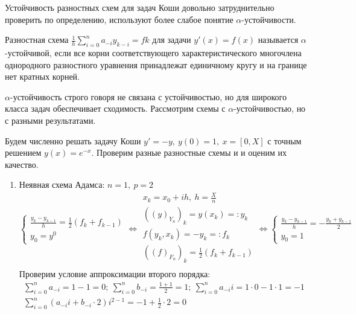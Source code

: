 Устойчивость разностных схем для задач Коши довольно
затруднительно проверить по определению, используют более слабое понятие
$\alpha$-устойчивости.

\begin{definition}
  Разностная схема $\frac{1}{h}\sum_{i=0}^{n}a_{-i}y_{k-i}=fk$ для задачи
  $y'(x)=f(x)$ называется $\alpha$-устойчивой, если все корни
  соответствующего характеристического многочлена однородного
  разностного уравнения принадлежат единичному кругу и на границе
  нет кратных корней.
\end{definition}

\begin{remark}
  $\alpha$-устойчивость строго говоря не связана с устойчивостью, но
  для широкого класса задач обеспечивает сходимость.
  Рассмотрим схемы с $\alpha$-устойчивостью, но с разными
  результатами.
  \begin{example}
    Будем численно решать задачу Коши $y'=-y,\ y(0)=1,\ x=[0,X]$
    с точным решением $y(x)=e^{-x}$. Проверим разные разностные схемы и
    и оценим их качество.
    \begin{enumerate}
      \item Неявная схема Адамса: $n=1,\ p=2$
            \[
              \begin{cases}
                \frac{y_{k}-y_{k-1}}{h}=\frac{1}{2}\left({f_{k}+f_{k-1}}\right) \\
                y_0=y^0
              \end{cases} \Leftrightarrow
              \begin{array}{c}
                x_k=x_0+ih,\ h=\frac{X}{n}                            \\
                ((y)_{Y_n})_k=y(x_k)=:y_k                             \\
                f(y_{k},x_k)=-y_k=:f_{k}                              \\
                ((f)_{F_n})_k=\frac{1}{2}\left({f_{k}+f_{k-1}}\right) \\
              \end{array}\Leftrightarrow
              \begin{cases}
                \frac{y_k-y_{k-1}}{h}=-\frac{y_k+y_{k-1}}{2} \\
                y_0=1
              \end{cases}
            \]
            Проверим условие аппроксимации второго порядка:
            \[\begin{array}{c}
                \sum\limits_{i=0}^na_{-i}=1-1=0;\ \sum\limits_{i=0}^nb_{-i}=\frac{1+1}{2}=1;\ \sum\limits_{i=0}^na_{-i}i=1\cdot0 - 1\cdot1=-1 \\
                \sum\limits_{i=0}^n(a_{-i}i+b_{-i}\cdot2)i^{2-1}=-1 + \frac{1}{2}\cdot2=0
              \end{array}\]


\end{enumerate}
\end{example}
\end{remark}
